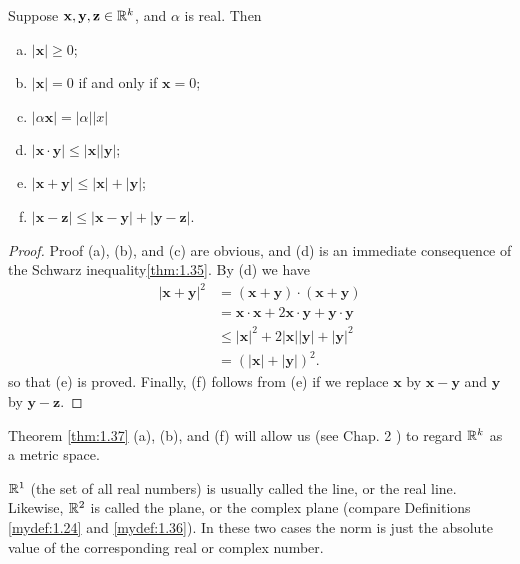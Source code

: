 \begin{thm}\label{thm:1.37}
    Suppose $\mathbf{x}, \mathbf{y}, \mathbf{z}\in{\protect\mathbb R}^k$, and $\alpha$ is real. Then
    \begin{enumerate}[(a)]
        \item $| \mathbf{x}| \geq 0$;
        \item $| \mathbf{x}| = 0$ if and only if $\mathbf{x} =0$;
        \item $| \alpha \mathbf{x}| = | \alpha||x|$
        \item $|\mathbf{x}\cdot\mathbf{y}| \leq  |\mathbf{x}| | \mathbf{y}|$;
        \item $|\mathbf{x}+\mathbf{y}| \leq | \mathbf{x} | + | \mathbf{y}|$;
        \item $|\mathbf{x}-\mathbf{z}| \leq |\mathbf{x}-\mathbf{y}| + |\mathbf{y}-\mathbf{z}|$.
    \end{enumerate}
\end{thm}


\begin{proof}
    Proof (a), (b), and (c) are obvious, and (d) is an immediate consequence of the Schwarz inequality\ref{thm:1.35}.
    By (d) we have
    \begin{align*}
        |\mathbf{x} + \mathbf{y}|^2
         & = (\mathbf{x} + \mathbf{y}) \cdot (\mathbf{x} + \mathbf{y})                                \\
         & = \mathbf{x} \cdot \mathbf{x} + 2\mathbf{x} \cdot \mathbf{y} + \mathbf{y} \cdot \mathbf{y} \\
         & \leq |\mathbf{x}|^2 + 2|\mathbf{x}||\mathbf{y}| + |\mathbf{y}|^2                           \\
         & = \left(|\mathbf{x}| + |\mathbf{y}|\right)^2.
    \end{align*}
    so that (e) is proved. Finally,
    (f) follows from (e) if we
    replace $\mathbf{x}$ by $\mathbf{x}-\mathbf{y}$
    and $\mathbf{y}$ by $\mathbf{y}-\mathbf{z}$.
\end{proof}

\begin{myremark}
    \label{myremark:1.38}
    Theorem \ref{thm:1.37} (a), (b), and (f) will allow us (see Chap. 2
    ) to
    regard ${\protect\mathbb R}^k$ as a metric space.

    ${\protect\mathbb R}^1$ (the set of all real numbers) is usually called the line,
    or the real line.
    Likewise, ${\protect\mathbb R}^2$ is called the plane, or the complex plane (compare Definitions \ref{mydef:1.24} and \ref{mydef:1.36}).
    In these two cases the norm is just the absolute value of the corresponding real or complex number.
\end{myremark}

